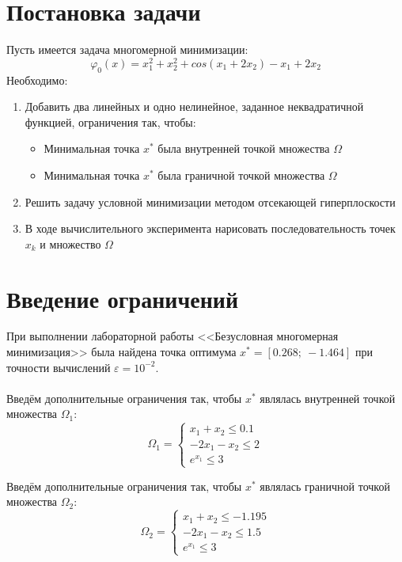 \documentclass{article}
\begin{document}
\section{Постановка задачи}
\noindent Пусть имеется задача многомерной минимизации:
$$\varphi_0(x)=x_1^{2}+x_2^{2}+cos(x_1+2x_2)-x_1+2x_2$$
Необходимо:
\begin{enumerate}
    \item Добавить два линейных и одно нелинейное, заданное неквадратичной функцией, ограничения так, чтобы:
    \begin{itemize}
        \item Минимальная точка $x^{*}$ была внутренней точкой множества $\Omega$
        \item Минимальная точка $x^{*}$ была граничной точкой множества $\Omega$
    \end{itemize}
    \item Решить задачу условной минимизации методом отсекающей гиперплоскости
    \item В ходе вычислительного эксперимента нарисовать последовательность точек $x_k$ и множество $\Omega$
\end{enumerate}

\section{Введение ограничений}
\noindent При выполнении лабораторной работы <<Безусловная многомерная минимизация>> была найдена точка оптимума $x^{*}=[0.268;~-1.464]$ при точности вычислений $\varepsilon=10^{-2}$.\\\\
\noindent Введём дополнительные ограничения так, чтобы $x^{*}$ являлась внутренней точкой множества $\Omega_1$:
\begin{equation*}
\Omega_1 = 
    \begin{cases}
    x_1+x_2\le 0.1\\
    -2x_1-x_2\le2\\
    e^{x_1}\le 3
    \end{cases}
\end{equation*}

\noindent Введём дополнительные ограничения так, чтобы $x^{*}$ являлась граничной точкой множества $\Omega_2$:
\begin{equation*}
\Omega_2 = 
    \begin{cases}
    x_1+x_2\le -1.195\\
    -2x_1-x_2\le1.5\\
    e^{x_1}\le 3
    \end{cases}
\end{equation*}
\end{document}
